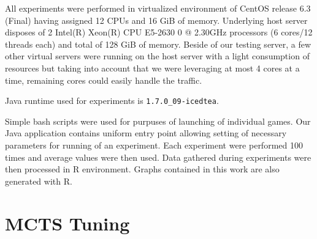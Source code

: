 All experiments were performed in virtualized environment of CentOS release 6.3 (Final) having
assigned 12 CPUs and 16 GiB of memory. Underlying host server disposes of 2 Intel(R) Xeon(R) 
CPU E5-2630 0 @ 2.30GHz processors (6 cores/12 threads each) and total of 128 GiB of memory.
Beside of our testing server, a few other virtual servers were running on the host server with
a light consumption of resources but taking into account that we were leveraging at most 4
cores at a time, remaining cores could easily handle the traffic. 


Java runtime used for experiments is \texttt{1.7.0\_09-icedtea}.

Simple bash scripts were used for purpuses of launching of individual games. Our Java
application contains uniform entry point allowing setting of necessary parameters for running
of an experiment. Each experiment were performed 100 times and average values were then used.
Data gathered during experiments were then processed in R environment. Graphs contained in this
work are also generated with R.



\section{MCTS Tuning}
\label{sec_mcts_tuning}

